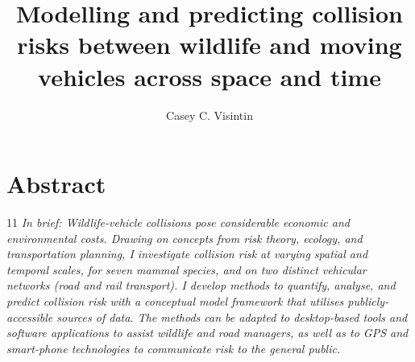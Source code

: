 \documentclass[titlesmallcaps,copyrightpage,examinerscopy]{uomthesis}
\begin{document}
\frontmatter
\title{Modelling and predicting collision risks between wildlife and moving vehicles across space and time}
\author{Casey C. Visintin}

\titlepage
\clearpage{\pagestyle{empty}\cleardoublepage}

\chapter{Abstract}
\begin{localsize-main}{11}
\noindent\textit{In brief: Wildlife-vehicle collisions pose considerable economic and environmental costs. Drawing on concepts from risk theory, ecology, and transportation planning, I investigate collision risk at varying spatial and temporal scales, for seven mammal species, and on two distinct vehicular networks (road and rail transport). I develop methods to quantify, analyse, and predict collision risk with a conceptual model framework that utilises publicly-accessible sources of data. The methods can be adapted to desktop-based tools and software applications to assist wildlife and road managers, as well as to GPS and smart-phone technologies to communicate risk to the general public.}
\end{localsize-main}
\end{document}
